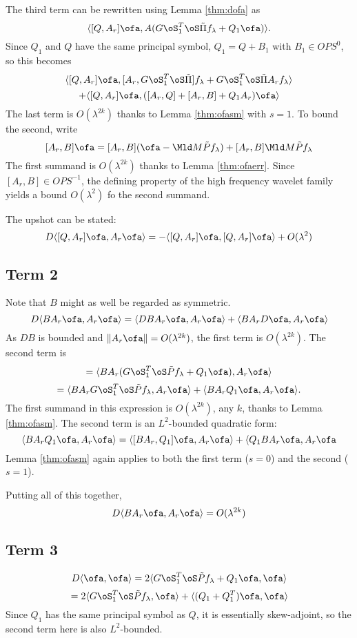 The third term can be rewritten using Lemma \ref{thm:dofa} as 
\[
\langle [Q,A_r] \ofa, A(G\oS_1^T\oS\tilde{\Pi}f_{\lambda} + Q_1\ofa)\rangle.
\]
Since $Q_1$ and $Q$ have the same principal symbol, $Q_1=Q+B_1$ with $B_1 \in OPS^0$, so this becomes
\[
 \langle [Q,A_r] \ofa, [A_r,G\oS_1^T\oS\tilde{\Pi}]f_{\lambda} +G\oS_1^T\oS\tilde{\Pi} A_r f_{\lambda}\rangle 
\]
\[
+ \langle[Q,A_r] \ofa, ([A_r, Q] + [A_r,B] + Q_1A_r)\ofa\rangle
\]
The last term is $O(\lambda^{2k})$ thanks to Lemma \ref{thm:ofasm} with $s=1$. To bound the second, write 
\[
[A_r,B] \ofa = [A_r,B] (\ofa - \Mld M\tilde{P}f_{\lambda}) + [A_r,B] \Mld M\tilde{P}f_{\lambda}
\]
The first summand is $O(\lambda^{2k})$ thanks to Lemma \ref{thm:ofaerr}. Since $[A_r,B]  \in OPS^{-1}$, the defining property of the high frequency wavelet family yields
a bound $O(\lambda^2)$ fo the second summand.

The upshot can be stated:
\begin{equation}
\label{eqn:term1}
D\langle [Q,A_r] \ofa, A_r\ofa \rangle = -\langle [Q,A_r]\ofa,[Q,A_r]\ofa \rangle + O(\lambda^2)
\end{equation}

\subsection{Term 2}
Note that $B$ might as well be regarded as symmetric.
\[
D\langle BA_r\ofa,A_r\ofa \rangle = \langle DB A_r \ofa, A_r \ofa \rangle + \langle B A_r D \ofa, A_r \ofa \rangle
\]
As $DB$ is bounded and $\|A_r \ofa\| = O(\lambda^{2k})$, the first term is $O(\lambda^{2k})$. The second term is
\[
= \langle B A_r (G \oS_1^T \oS\tilde{P}f_{\lambda} + Q_1\ofa),A_r \ofa \rangle
\]
\[
= \langle BA_r G \oS_1^T \oS\tilde{P}f_{\lambda}, A_r \ofa \rangle
+ \langle BA_r Q_1 \ofa, A_r\ofa \rangle.
\]
The first summand in this expression is $O(\lambda^{2k})$, any $k$, thanks to Lemma \ref{thm:ofasm}. The second term is an $L^2$-bounded quadratic form:
\[
\langle BA_r Q_1 \ofa, A_r\ofa \rangle = \langle [BA_r, Q_1]\ofa, A_r\ofa\rangle + \langle Q_1 BA_r \ofa, A_r \ofa
\]
Lemma \ref{thm:ofasm} again applies to both the first term ($s=0$) and the second ($s=1$).

Putting all of this together,
\[
D\langle BA_r\ofa,A_r\ofa \rangle = O(\lambda^{2k})
\]

\subsection{Term 3}
\[
D\langle \ofa,\ofa \rangle = 2\langle G\oS_1^T \oS \tilde{P}f_{\lambda} + Q_1\ofa,\ofa\rangle 
\]
\[
= 2\langle G\oS_1^T \oS \tilde{P}f_{\lambda},\ofa\rangle + \langle (Q_1+Q_1^T)\ofa,\ofa \rangle
\]
Since $Q_1$ has the same principal symbol as $Q$, it is essentially skew-adjoint, so the second term here is also $L^2$-bounded.

